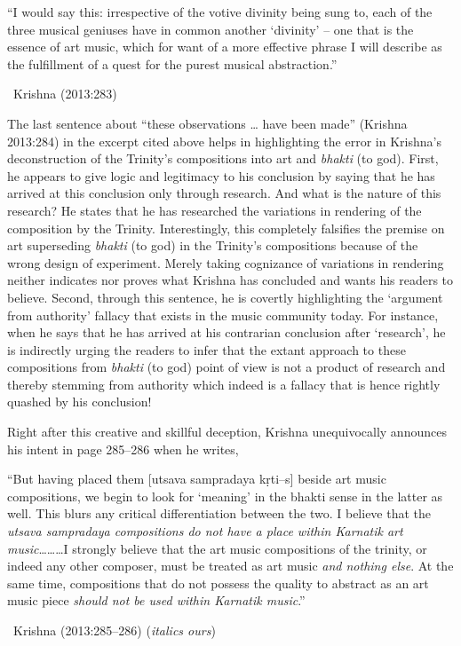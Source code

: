\begin{myquote}
“I would say this: irrespective of the votive divinity being sung to, each of the three musical geniuses have in common another ‘divinity’ – one that is the essence of art music, which for want of a more effective phrase I will describe as the fulfillment of a quest for the purest musical abstraction.” 

~\hfill Krishna (2013:283)
\end{myquote}

The last sentence about “these observations … have been made” (Krishna 2013:284) in the excerpt cited above helps in highlighting the error in Krishna’s deconstruction of the Trinity’s compositions into art and \textit{bhakti} (to god). First, he appears to give logic and legitimacy to his conclusion by saying that he has arrived at this conclusion only through research. And what is the nature of this research? He states that he has researched the variations in rendering of the composition by the Trinity. Interestingly, this completely falsifies the premise on art superseding \textit{bhakti} (to god) in the Trinity’s compositions because of the wrong design of experiment. Merely taking cognizance of variations in rendering neither indicates nor proves what Krishna has concluded and wants his readers to believe. Second, through this sentence, he is covertly highlighting the ‘argument from authority’ fallacy that exists in the music community today. For instance, when he says that he has arrived at his contrarian conclusion after ‘research’, he is indirectly urging the readers to infer that the extant approach to these compositions from \textit{bhakti} (to god) point of view is not a product of research and thereby stemming from authority which indeed is a fallacy that is hence rightly quashed by his conclusion!

Right after this creative and skillful deception, Krishna unequivocally announces his intent in page 285–286 when he writes,

\begin{myquote}
“But having placed them [utsava sampradaya kṛti–s] beside art music compositions, we begin to look for ‘meaning’ in the bhakti sense in the latter as well. This blurs any critical differentiation between the two. I believe that the \textit{utsava sampradaya compositions do not have a place within Karnatik art music}………I strongly believe that the art music compositions of the trinity, or indeed any other composer, must be treated as art music \textit{and nothing else}. At the same time, compositions that do not possess the quality to abstract as an art music piece \textit{should not be used within Karnatik music}.” 

~\hfill Krishna (2013:285–286) (\textit{italics ours})
\end{myquote}

